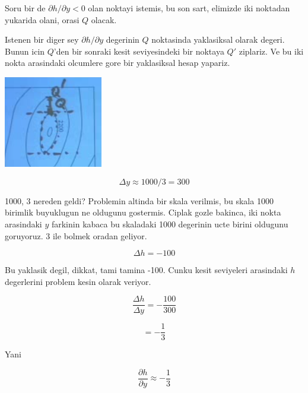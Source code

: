 \documentclass[12pt,fleqn]{article}\usepackage{../common}
\begin{document}
Soru bir de  $\partial h/\partial y < 0$ olan noktayi istemis, bu son sart,
elimizde iki noktadan yukarida olani, orasi $Q$ olacak. 

Istenen bir diger sey $\partial h/\partial y$ degerinin $Q$ noktasinda
yaklasiksal olarak degeri. Bunun icin $Q$'den bir sonraki kesit
seviyesindeki bir noktaya $Q'$ ziplariz. Ve bu iki nokta arasindaki
olcumlere gore bir yaklasiksal hesap yapariz. 

\includegraphics[height=4cm]{15_4.png}


\[ \Delta y \approx 1000 / 3 = 300 \]

1000, 3 nereden geldi? Problemin altinda bir skala verilmis, bu skala 1000
birimlik buyuklugun ne oldugunu gostermis. Ciplak gozle bakinca, iki nokta
arasindaki $y$ farkinin kabaca bu skaladaki 1000 degerinin ucte birini
oldugunu goruyoruz. 3 ile bolmek oradan geliyor. 

\[ \Delta h = -100 \]

Bu yaklasik degil, dikkat, tami tamina -100. Cunku kesit seviyeleri
arasindaki $h$ degerlerini problem kesin olarak veriyor.

\[ 
\frac{\Delta h}{\Delta y} = -\frac{100}{300}
 \]

\[ = -\frac{1}{3} \]

Yani 

\[ 
\frac{\partial h}{\partial y} \approx -\frac{1}{3}
 \]
\end{document}
